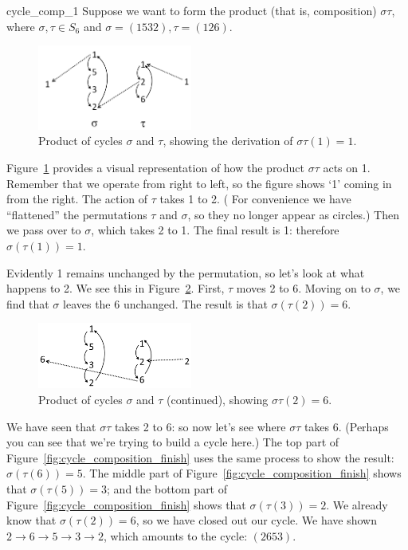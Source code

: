 \begin{example}{cycle_comp_1}
Suppose we want to form the product (that is, composition)
 $\sigma \tau$, where $\sigma, \tau \in S_6$ and
$\sigma  = (1 5 3 2 ),
\tau    = (1 2 6)$.

\begin{figure}[ht]
\begin{center}
\includegraphics[width=2.0in]{images/cycle_composition.png}
\caption{Product of cycles $\sigma$ and $\tau$, showing the derivation of $\sigma \tau (1) = 1$.}
\label{fig:cycle_composition}
\end{center}
\end{figure}

Figure~\ref{fig:cycle_composition} provides a visual representation of how the product $\sigma \tau$ acts on 1. Remember that we operate from right to left, so the figure shows `1' coming in from the right. The action of  $\tau$ takes 1 to 2. ( For convenience we have ``flattened'' the permutations $\tau$ and $\sigma$, so they no longer appear as circles.) Then we pass over to $\sigma$, which takes 2 to 1.  The final result is 1: therefore $\sigma(\tau(1)) = 1$.

Evidently 1 remains unchanged by the permutation, so let's look at what happens to 2. We see this in  Figure~\ref{fig:cycle_composition2}.  First, $\tau$ moves 2 to 6. Moving on to $\sigma$, we find that $\sigma$ leaves the 6 unchanged. The result is that $\sigma(\tau(2)) = 6$.

\begin{figure}[ht]
\begin{center}
\includegraphics[width=2.0in]{images/cycle_composition_2.png}
\caption{Product of cycles $\sigma$ and $\tau$ (continued), showing $\sigma \tau (2) = 6$.}
\label{fig:cycle_composition2}
\end{center}
\end{figure}
We have seen that $\sigma\tau$ takes 2 to 6: so now let's see where $\sigma\tau$ takes 6. (Perhaps you can see that we're trying to build a cycle here.)  
The top part of Figure~\ref{fig:cycle_composition_finish} uses the same process to show the result:  $\sigma(\tau(6)) = 5$.  
The middle part of Figure~\ref{fig:cycle_composition_finish} shows that $\sigma(\tau(5)) = 3$; and the bottom part of Figure~\ref{fig:cycle_composition_finish} shows that $\sigma(\tau(3)) = 2$. We already know that $\sigma(\tau(2)) = 6$, so we have closed out our cycle. We have shown $2 \rightarrow 6  \rightarrow 5  \rightarrow 3  \rightarrow 2$, which amounts to the cycle: $(2653)$.


\end{example}
